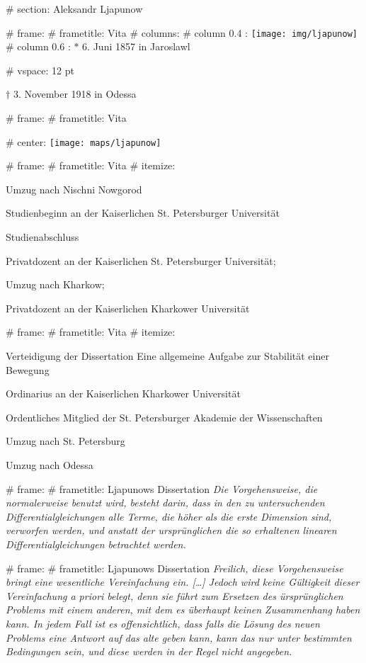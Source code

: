 # section: Aleksandr Ljapunow

# frame:
  # frametitle: Vita
  # columns:
    # column {0.4 \textwidth}:
      \texttt{[image: img/ljapunow]}
    # column {0.6 \textwidth}:
      $*$ 6. Juni 1857 in Jaroslawl

      # vspace: 12 pt

      $\dagger$ 3. November 1918 in Odessa

# frame:
  # frametitle: Vita

  # center:
    \texttt{[image: maps/ljapunow]}

# frame:
  # frametitle: Vita
    # itemize:
      \item[1870 (13)] Umzug nach Nischni Nowgorod
      \item[1876 (19)] Studienbeginn an der Kaiserlichen St. Petersburger Universität
      \item[1882 (25)] Studienabschluss
      \item[1885 (28)] Privatdozent an der Kaiserlichen St. Petersburger Universität;
      \item[{}] Umzug nach Kharkow;
      \item[{}] Privatdozent an der Kaiserlichen Kharkower Universität

# frame:
  # frametitle: Vita
    # itemize:
      \item[1892 (35)] Verteidigung der Dissertation \glqq Eine allgemeine Aufgabe zur Stabilität einer Bewegung\grqq
      \item[1893 (36)] Ordinarius an der Kaiserlichen Kharkower Universität
      \item[1901 (44)] Ordentliches Mitglied der St. Petersburger Akademie der Wissenschaften
      \item[1902 (45)] Umzug nach St. Petersburg
      \item[1917 (60)] Umzug nach Odessa

# frame:
  # frametitle: Ljapunows Dissertation
  \emph{%
    \glqq
    Die Vorgehensweise, die normalerweise benutzt wird, besteht darin, dass in den zu
    untersuchenden Differentialgleichungen alle Terme, die höher als die erste Dimension sind,
    verworfen werden, und anstatt der ursprünglichen die so
    erhaltenen linearen Differentialgleichungen betrachtet werden.%
    \grqq
  }

# frame:
  # frametitle: Ljapunows Dissertation
  \emph{%
    \glqq
    Freilich, diese Vorgehensweise bringt eine wesentliche Vereinfachung ein. [\ldots]
    Jedoch wird keine Gültigkeit dieser Vereinfachung \emph{a priori} belegt,
    denn sie führt zum Ersetzen des ürsprünglichen Problems mit einem anderen,
    mit dem es überhaupt keinen Zusammenhang haben kann. In jedem Fall ist es offensichtlich,
    dass falls die Lösung des neuen Problems eine Antwort auf das alte geben kann,
    kann das nur unter bestimmten Bedingungen sein, und diese werden in der Regel nicht angegeben.%
    \grqq
  }

